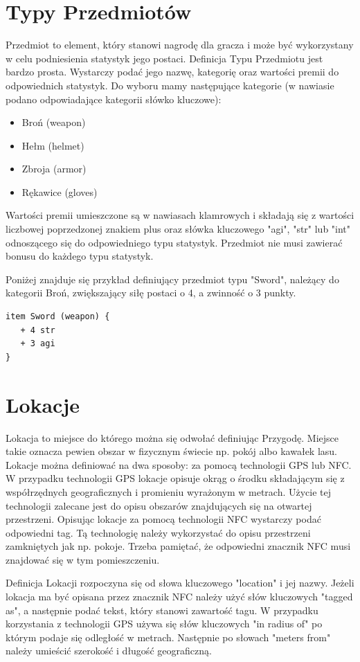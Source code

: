 \documentclass{xmgr}
\begin{document}
\section{Typy Przedmiotów}
Przedmiot to element, który stanowi nagrodę dla gracza i może być wykorzystany w celu podniesienia statystyk jego postaci. Definicja Typu Przedmiotu jest bardzo prosta. Wystarczy podać jego nazwę, kategorię oraz wartości premii do odpowiednich statystyk.
Do wyboru mamy następujące kategorie (w nawiasie podano odpowiadające kategorii słówko kluczowe):
\begin{itemize}
	\item Broń (weapon)
	\item Hełm (helmet)
	\item Zbroja (armor)
	\item Rękawice (gloves)
\end{itemize}
Wartości premii umieszczone są w nawiasach klamrowych i składają się z wartości liczbowej poprzedzonej znakiem plus oraz słówka kluczowego "agi", "str" lub "int" odnoszącego się do odpowiedniego typu statystyk. Przedmiot nie musi zawierać bonusu do każdego typu statystyk.

Poniżej znajduje się przykład definiujący przedmiot typu "Sword", należący do kategorii Broń, zwiększający siłę postaci o 4, a zwinność o 3 punkty.
\begin{lstlisting}
item Sword (weapon) {
   + 4 str
   + 3 agi
}
\end{lstlisting}

\section{Lokacje}
Lokacja to miejsce do którego można się odwołać definiując Przygodę. Miejsce takie oznacza pewien obszar w fizycznym świecie np. pokój albo kawałek lasu. Lokacje można definiować na dwa sposoby: za pomocą technologii GPS lub NFC. 
W przypadku technologii GPS lokacje opisuje okrąg o środku składającym się z współrzędnych geograficznych i promieniu wyrażonym w metrach. Użycie tej technologii zalecane jest do opisu obszarów znajdujących się na otwartej przestrzeni.
Opisując lokacje za pomocą technologii NFC wystarczy podać odpowiedni tag. Tą technologię należy wykorzystać do opisu przestrzeni zamkniętych jak np. pokoje. Trzeba pamiętać, że odpowiedni znacznik NFC musi znajdować się w tym pomieszczeniu.

Definicja Lokacji rozpoczyna się od słowa kluczowego "location" i jej nazwy. Jeżeli lokacja ma być opisana przez znacznik NFC należy użyć słów kluczowych "tagged as", a następnie podać tekst, który stanowi zawartość tagu. W przypadku korzystania z technologii GPS używa się słów kluczowych "in radius of" po którym podaje się odległość w metrach. Następnie po słowach "meters from" należy umieścić szerokość i długość geograficzną.
\end{document}
